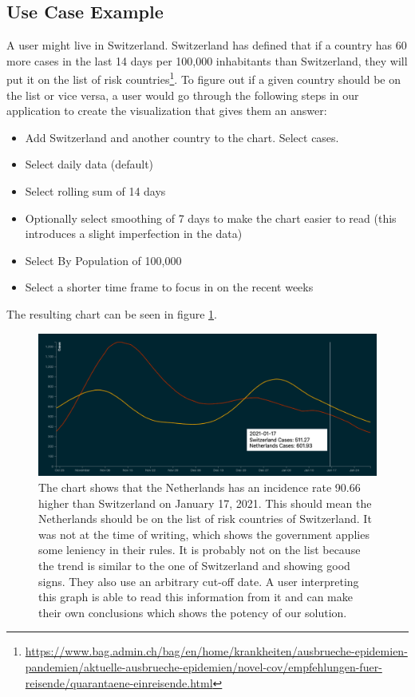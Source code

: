 \subsection{Use Case Example}
A user might live in Switzerland. Switzerland has defined that if a country has 60 more cases in the last 14 days per 100,000 inhabitants than Switzerland, they will put it on the list of risk countries\footnote{\href{https://www.bag.admin.ch/bag/en/home/krankheiten/ausbrueche-epidemien-pandemien/aktuelle-ausbrueche-epidemien/novel-cov/empfehlungen-fuer-reisende/quarantaene-einreisende.html}{https://www.bag.admin.ch/bag/en/home/krankheiten/ausbrueche-epidemien-pandemien/aktuelle-ausbrueche-epidemien/novel-cov/empfehlungen-fuer-reisende/quarantaene-einreisende.html}}. 
To figure out if a given country should be on the list or vice versa, a user would go through the following steps in our application to create the visualization that gives them an answer:

\begin{itemize}
    \item Add Switzerland and another country to the chart. Select cases.
    \item Select daily data (default)
    \item Select rolling sum of 14 days
    \item Optionally select smoothing of 7 days to make the chart easier to read (this introduces a slight imperfection in the data)
    \item Select By Population of 100,000
    \item Select a shorter time frame to focus in on the recent weeks
\end{itemize}

The resulting chart can be seen in figure \ref{fig:che-vs-nld}.

\begin{figure}
\centerline{\includegraphics[scale=.23]{figs/che-vs-nld.png}}
\caption{The chart shows that the Netherlands has an incidence rate 90.66 higher than Switzerland on January 17, 2021. This should mean the Netherlands should be on the list of risk countries of Switzerland. It was not at the time of writing, which shows the government applies some leniency in their rules. It is probably not on the list because the trend is similar to the one of Switzerland and showing good signs. They also use an arbitrary cut-off date. A user interpreting this graph is able to read this information from it and can make their own conclusions which shows  the potency of our solution.}
\label{fig:che-vs-nld}
\end{figure}
